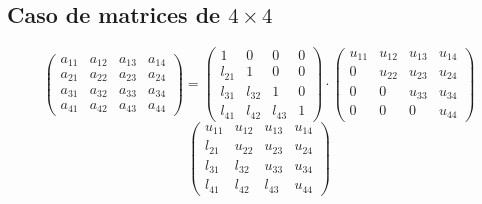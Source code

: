 \documentclass[10pt,a4paper,dvipdfmx]{article}
\begin{document}
\subsection{Caso de matrices de $4\times 4$ }
$$ \left( 
\begin{array}{cccc}
a_{{1}{1}} & a_{{1}{2}} & a_{{1}{3}} & a_{{1}{4}} \\
a_{{2}{1}} & a_{{2}{2}} & a_{{2}{3}} & a_{{2}{4}} \\
a_{{3}{1}} & a_{{3}{2}} & a_{{3}{3}} & a_{{3}{4}} \\
a_{{4}{1}} & a_{{4}{2}} & a_{{4}{3}} & a_{{4}{4}} 
 \end{array}
\right)
 = \left( 
\begin{array}{cccc}
1 & 0 & 0 & 0 \\
l_{{2}{1}} & 1 & 0 & 0 \\
l_{{3}{1}} & l_{{3}{2}} & 1 & 0 \\
l_{{4}{1}} & l_{{4}{2}} & l_{{4}{3}} & 1 
 \end{array}
\right)
 \cdot \left( 
\begin{array}{cccc}
u_{{1}{1}} & u_{{1}{2}} & u_{{1}{3}} & u_{{1}{4}} \\
0 & u_{{2}{2}} & u_{{2}{3}} & u_{{2}{4}} \\
0 & 0 & u_{{3}{3}} & u_{{3}{4}} \\
0 & 0 & 0 & u_{{4}{4}} 
 \end{array}
\right)
 $$
$$ \left( 
\begin{array}{cccc}
u_{{1}{1}} & u_{{1}{2}} & u_{{1}{3}} & u_{{1}{4}} \\
l_{{2}{1}} & u_{{2}{2}} & u_{{2}{3}} & u_{{2}{4}} \\
l_{{3}{1}} & l_{{3}{2}} & u_{{3}{3}} & u_{{3}{4}} \\
l_{{4}{1}} & l_{{4}{2}} & l_{{4}{3}} & u_{{4}{4}} 
 \end{array}
\right)
 $$
\end{document}
